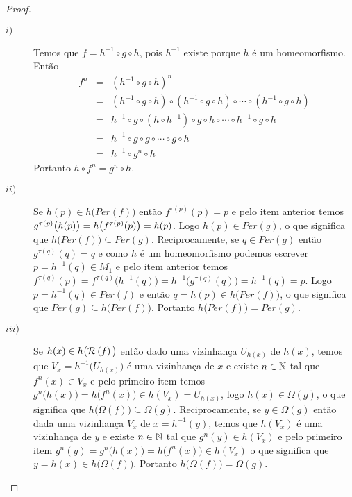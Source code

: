 \begin{proof}
\begin{description}
\item[$i)$] Temos que $f=h^{-1}\circ g\circ h$, pois $h^{-1}$ existe porque $h$ é um homeomorfismo. Então \vspace{-0.5cm}\begin{eqnarray*}
f^n & = & (h^{-1}\circ g\circ h)^n\\
 & = &(h^{-1}\circ g\circ h)\circ(h^{-1}\circ g\circ h)\circ\cdots\circ(h^{-1}\circ g\circ h)\\
 & = & h^{-1}\circ g\circ (h\circ h^{-1})\circ g\circ h\circ\cdots\circ h^{-1}\circ g\circ h\\
 & = & h^{-1}\circ g\circ g\circ\cdots\circ g\circ h\\
 & = & h^{-1}\circ g^n\circ h
\end{eqnarray*}
Portanto $h\circ f^n= g^n\circ h$.

\item[$ii)$] Se $h(p)\in h\big(Per(f)\big)$ então $f^{\tau(p)}(p)=p$ e pelo item anterior temos $g^{\tau(p)}\big(h(p)\big)=h\big(f^{\tau(p)}(p)\big)\\=h(p)$. Logo $h(p)\in Per(g)$, o que significa que $h\big(Per(f)\big)\subseteq Per(g)$. Reciprocamente, se $q\in Per(g)$ então $g^{\tau(q)}(q)=q$ e como $h$ é um homeomorfismo podemos escrever $p=h^{-1}(q)\in M_1$ e pelo item anterior temos $f^{\tau(q)}(p)=f^{\tau(q)}\big(h^{-1}(q)\big)=h^{-1}\big(g^{\tau(q)}(q)\big)=h^{-1}(q)=p$. Logo $p=h^{-1}(q)\in Per(f)$ e então $q=h(p)\in h\big(Per(f)\big)$, o que significa que $Per(g)\subseteq h\big(Per(f)\big)$. Portanto $h\big(Per(f)\big)=Per(g)$.

\item[$iii)$] Se $h(x)\in h\big(\mathcal{R}\left(f\right)\big)$ então dado uma vizinhança $U_{h(x)}$ de $h(x)$, temos que $V_x=h^{-1}\big(U_{h(x)}\big)$ é uma vizinhança de $x$ e existe $n\in\mathbb{N}$ tal que $f^n(x)\in V_x$ e pelo primeiro item temos $g^n\big(h(x)\big)=h\big(f^n(x)\big)\in h(V_x)=U_{h(x)}$, logo $h(x)\in \Omega(g)$, o que significa que $h\big(\Omega(f)\big)\subseteq\Omega(g)$. Reciprocamente, se $y\in\Omega(g)$  então dada uma vizinhança $V_x$ de $x=h^{-1}(y)$, temos que $h(V_x)$ é uma vizinhança de $y$ e existe $n\in\mathbb{N}$ tal que $g^n(y)\in h(V_x)$ e pelo primeiro item $g^n(y)=g^n\big(h(x)\big)=h\big(f^n(x)\big)\in h(V_x)$ o que significa que $y=h(x)\in h\big(\Omega(f)\big)$. Portanto $h\big(\Omega(f)\big)=\Omega(g)$.



\end{description}
\end{proof}
